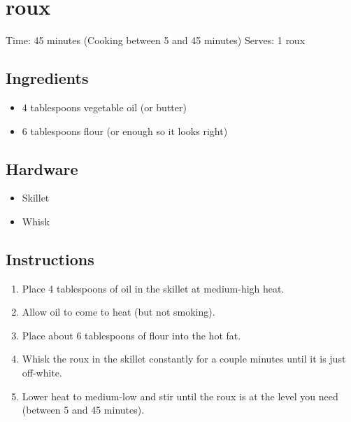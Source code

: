\section{roux}
\label{roux}
\setcounter{secnumdepth}{0}
Time: 45 minutes (Cooking between 5 and 45 minutes)
Serves: 1 roux

\begin{multicols}{2}
\subsection*{Ingredients}
\begin{itemize}
    \item 4 tablespoons vegetable oil (or butter)
    \item 6 tablespoons flour (or enough so it looks right)
\end{itemize}

\subsection*{Hardware}
\begin{itemize}
    \item Skillet
    \item Whisk
\end{itemize}
\clearpage

\subsection*{Instructions}
\begin{enumerate}
    \item Place 4 tablespoons of oil in the skillet at medium-high heat.
    \item Allow oil to come to heat (but not smoking).
    \item Place about 6 tablespoons of flour into the hot fat.
    \item Whisk the roux in the skillet constantly for a couple minutes until it is just off-white.
    \item Lower heat to medium-low and stir until the roux is at the level you need (between 5 and 45 minutes).
\end{enumerate}


\end{multicols}
